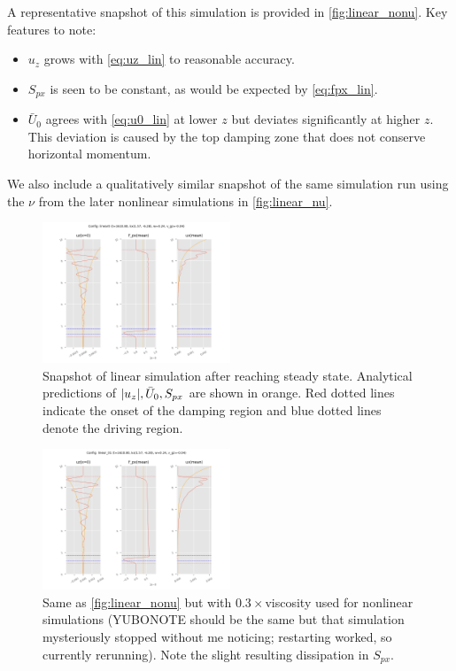 \documentclass[twocolumn,
        nofootinbib, %
        usenames, %
        aps,
        prd,
        dvipsnames %
    ]{revtex4-1}%
\DeclarePairedDelimiter\abs{\lvert}{\rvert}
\begin{document}
A representative snapshot of this simulation
is provided in \autoref{fig:linear_nonu}. Key features to note:
\begin{itemize}
    \item $u_z$ grows with \autoref{eq:uz_lin} to reasonable accuracy.

    \item $S_{px}$ is seen to be constant, as would be expected by
        \autoref{eq:fpx_lin}.

    \item $\bar{U}_0$ agrees with \autoref{eq:u0_lin} at lower $z$ but deviates
        significantly at higher $z$. This deviation is caused by the top damping
        zone that does not conserve horizontal momentum.
\end{itemize}
We also include a qualitatively similar snapshot of the same simulation run
using the $\nu$ from the later nonlinear simulations in \autoref{fig:linear_nu}.
\begin{figure}[t]
    \centering
    \includegraphics[width=0.5\textwidth]{plots/linear_nonu.png}
    \caption{Snapshot of linear simulation after reaching steady state.
        Analytical predictions of $\abs*{u_z}, \bar{U}_0, S_{px}$ are shown in
        orange. Red dotted lines indicate the onset of the damping region and
        blue dotted lines denote the driving region.}\label{fig:linear_nonu}
\end{figure}
\begin{figure}[t]
    \centering
    \includegraphics[width=0.5\textwidth]{plots/linear_nu.png}
    \caption{Same as \autoref{fig:linear_nonu} but with $0.3\times $viscosity
    used for nonlinear simulations (YUBONOTE should be the same but that
    simulation mysteriously stopped without me noticing; restarting worked, so
    currently rerunning). Note the slight resulting dissipation in $S_{px}$.
    }\label{fig:linear_nu}
\end{figure}
\end{document}
